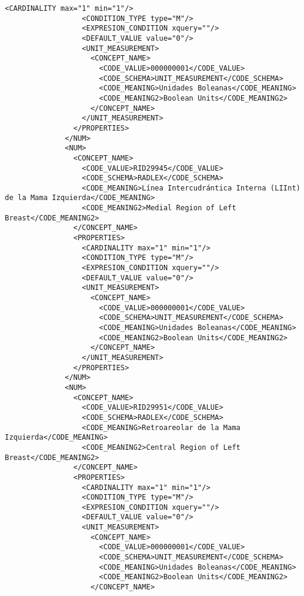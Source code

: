 \begin{lstlisting}[label=dicom-report,caption=Informe estructurado de una exploración de mama]
                  <CARDINALITY max="1" min="1"/>
                  <CONDITION_TYPE type="M"/>
                  <EXPRESION_CONDITION xquery=""/>
                  <DEFAULT_VALUE value="0"/>
                  <UNIT_MEASUREMENT>
                    <CONCEPT_NAME>
                      <CODE_VALUE>000000001</CODE_VALUE>
                      <CODE_SCHEMA>UNIT_MEASUREMENT</CODE_SCHEMA>
                      <CODE_MEANING>Unidades Boleanas</CODE_MEANING>
                      <CODE_MEANING2>Boolean Units</CODE_MEANING2>
                    </CONCEPT_NAME>
                  </UNIT_MEASUREMENT>
                </PROPERTIES>
              </NUM>
              <NUM>
                <CONCEPT_NAME>
                  <CODE_VALUE>RID29945</CODE_VALUE>
                  <CODE_SCHEMA>RADLEX</CODE_SCHEMA>
                  <CODE_MEANING>Línea Intercudrántica Interna (LIInt) de la Mama Izquierda</CODE_MEANING>
                  <CODE_MEANING2>Medial Region of Left Breast</CODE_MEANING2>
                </CONCEPT_NAME>
                <PROPERTIES>
                  <CARDINALITY max="1" min="1"/>
                  <CONDITION_TYPE type="M"/>
                  <EXPRESION_CONDITION xquery=""/>
                  <DEFAULT_VALUE value="0"/>
                  <UNIT_MEASUREMENT>
                    <CONCEPT_NAME>
                      <CODE_VALUE>000000001</CODE_VALUE>
                      <CODE_SCHEMA>UNIT_MEASUREMENT</CODE_SCHEMA>
                      <CODE_MEANING>Unidades Boleanas</CODE_MEANING>
                      <CODE_MEANING2>Boolean Units</CODE_MEANING2>
                    </CONCEPT_NAME>
                  </UNIT_MEASUREMENT>
                </PROPERTIES>
              </NUM>
              <NUM>
                <CONCEPT_NAME>
                  <CODE_VALUE>RID29951</CODE_VALUE>
                  <CODE_SCHEMA>RADLEX</CODE_SCHEMA>
                  <CODE_MEANING>Retroareolar de la Mama Izquierda</CODE_MEANING>
                  <CODE_MEANING2>Central Region of Left Breast</CODE_MEANING2>
                </CONCEPT_NAME>
                <PROPERTIES>
                  <CARDINALITY max="1" min="1"/>
                  <CONDITION_TYPE type="M"/>
                  <EXPRESION_CONDITION xquery=""/>
                  <DEFAULT_VALUE value="0"/>
                  <UNIT_MEASUREMENT>
                    <CONCEPT_NAME>
                      <CODE_VALUE>000000001</CODE_VALUE>
                      <CODE_SCHEMA>UNIT_MEASUREMENT</CODE_SCHEMA>
                      <CODE_MEANING>Unidades Boleanas</CODE_MEANING>
                      <CODE_MEANING2>Boolean Units</CODE_MEANING2>
                    </CONCEPT_NAME>

\end{lstlisting}

